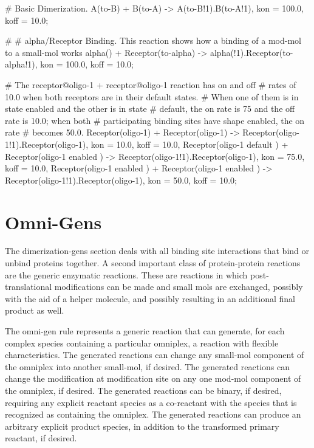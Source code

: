 \begin{ExampleMZR}

  # Basic Dimerization.
  A(to-B) + B(to-A) -> A(to-B!1).B(to-A!1),
       kon = 100.0,
       koff = 10.0;

    #
    # alpha/Receptor Binding.  This reaction shows how a binding of a
    mod-mol to a small-mol works
    alpha() + Receptor(to-alpha) -> alpha(!1).Receptor(to-alpha!1),
    	   kon = 100.0,
	   koff = 10.0;

    # The receptor@oligo-1 + receptor@oligo-1 reaction has on and off
    # rates of 10.0 when both receptors are in their default states.
    # When one of them is in state {enabled} and the other is in state
    # {default}, the on rate is 75 and the off rate is 10.0; when both
    # participating binding sites have shape {enabled}, the on rate
    # becomes 50.0.
    Receptor(oligo-1) + Receptor(oligo-1) -> Receptor(oligo-1!1).Receptor(oligo-1),
          kon = 10.0,
	  koff = 10.0,
       Receptor(oligo-1 { default} ) + Receptor(oligo-1 {enabled } )
         -> 
           Receptor(oligo-1!1).Receptor(oligo-1),
             kon = 75.0,
	     koff = 10.0,
       Receptor(oligo-1 { enabled } ) + Receptor(oligo-1 { enabled} ) 
         -> 
           Receptor(oligo-1!1).Receptor(oligo-1),
             kon = 50.0,
	     koff = 10.0;

\end{ExampleMZR}


 \section{Omni-Gens}
 The dimerization-gens section deals with all binding site interactions that bind
 or unbind proteins together.  A second important class of
 protein-protein reactions are the generic enzymatic reactions.  These
 are reactions in
 which post-translational modifications can be made and small mols are
 exchanged, possibly with the aid of a helper molecule, and possibly
 resulting in an additional final product as well.

 The omni-gen rule represents a generic reaction that can generate,
 for each complex species containing a particular omniplex, a reaction
 with flexible characteristics. The generated reactions can change any
 small-mol component of the omniplex into another small-mol, if
 desired. The generated reactions can change the modification at
 modification site on any one mod-mol component of the omniplex, if
 desired. The generated reactions can be binary, if desired, requiring
 any explicit reactant species as a co-reactant with the species that
 is recognized as containing the omniplex. The generated reactions can
 produce an arbitrary explicit product species, in addition to the
 transformed primary reactant, if desired. 
 
